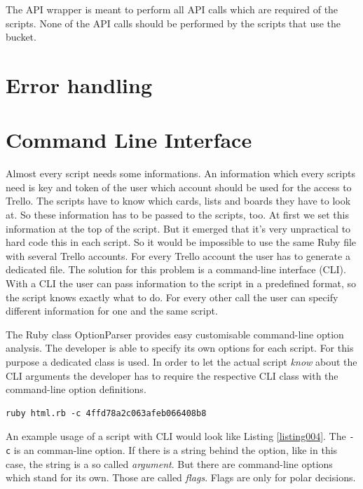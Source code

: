  The API wrapper is meant to perform all API calls which are required of the scripts. None of the API calls should be performed by the scripts that use the bucket.



\section{Error handling}

\section{Command Line Interface}\label{cli}
Almost every script needs some informations. An information which every scripts need is key and token of the user which account should be used for the access to Trello. The scripts have to know which cards, lists and boards they have to look at. So these information has to be passed to the scripts, too. At first we set this information at the top of the script. But it emerged that it's very unpractical to hard code this in each script. So it would be impossible to use the same Ruby file with several Trello accounts. For every Trello account the user has to generate a dedicated file. The solution for this problem is a command-line interface (CLI). With a CLI the user can pass information to the script in a predefined format, so the script knows exactly what to do. For every other call the user can specify different information for one and the same script.

The Ruby class OptionParser\cite{ruby:optionparser} provides easy customisable command-line option analysis. The developer is able to specify its own options for each script. For this purpose a dedicated class is used. 
In order to let the actual script \emph{know} about the CLI arguments the developer has to require the respective CLI class with the command-line option definitions.

\begin{lstlisting}[aboveskip=1\baselineskip, style=bash, caption=Example usage of a script with CLI., label=listing004]
ruby html.rb -c 4ffd78a2c063afeb066408b8
\end{lstlisting}

An example usage of a script with CLI would look like Listing \ref{listing004}. The \texttt{-c} is an comman-line option. If there is a string behind the option, like in this case, the string is a so called \emph{argument}. But there are command-line options which stand for its own. Those are called \emph{flags}. Flags are only for polar decisions.

